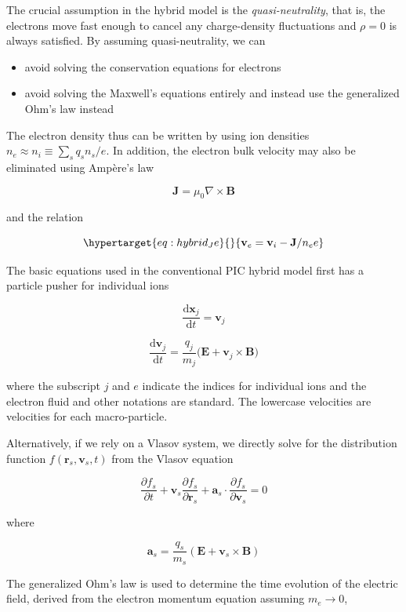 \documentclass[
  notoc %
]{tufte-book}
\providecommand{\tightlist}{%
  \setlength{\itemsep}{0pt}\setlength{\parskip}{0pt}
}
\begin{document}
The crucial assumption in the hybrid model is the
\emph{quasi-neutrality}, that is, the electrons move fast enough to
cancel any charge-density fluctuations and \(\rho=0\) is always
satisfied. By assuming quasi-neutrality, we can

\begin{itemize}
\tightlist
\item
  avoid solving the conservation equations for electrons
\item
  avoid solving the Maxwell's equations entirely and instead use the
  generalized Ohm's law instead
\end{itemize}

The electron density thus can be written by using ion densities
\(n_e \approx n_i \equiv \sum_s q_s n_s /e\). In addition, the electron
bulk velocity may also be eliminated using Ampère's law

\[
\mathbf{J} = \mu_0\nabla\times\mathbf{B}
\]

and the relation

\begin{equation}\protect\hypertarget{eq:hybrid_Je}{}{
\mathbf{v}_e = \mathbf{v}_i - \mathbf{J}/n_e e
}\label{eq:hybrid_Je}\end{equation}

The basic equations used in the conventional PIC hybrid model first has
a particle pusher for individual ions

\[
\frac{\mathrm{d}\mathbf{x}_j}{\mathrm{d}t} = \mathbf{v}_j
\]

\[
\frac{\mathrm{d}\mathbf{v}_j}{\mathrm{d}t} = \frac{q_j}{m_j}\big( \mathbf{E} + \mathbf{v}_j \times \mathbf{B} \big)
\]

where the subscript \(j\) and \(e\) indicate the indices for individual
ions and the electron fluid and other notations are standard. The
lowercase velocities are velocities for each macro-particle.

Alternatively, if we rely on a Vlasov system, we directly solve for the
distribution function \(f(\mathbf{r}_s, \mathbf{v}_s, t)\) from the
Vlasov equation

\[
\frac{\partial f_s}{\partial t} + \mathbf{v}_s\frac{\partial f_s}{\partial \mathbf{r}_s} + \mathbf{a}_s\cdot \frac{\partial f_s}{\partial \mathbf{v}_s} = 0
\]

where

\[
\mathbf{a}_s = \frac{q_s}{m_s}(\mathbf{E}+\mathbf{v}_s\times\mathbf{B})
\]

The generalized Ohm's law is used to determine the time evolution of the
electric field, derived from the electron momentum equation assuming
\(m_e \rightarrow 0\),
\end{document}
